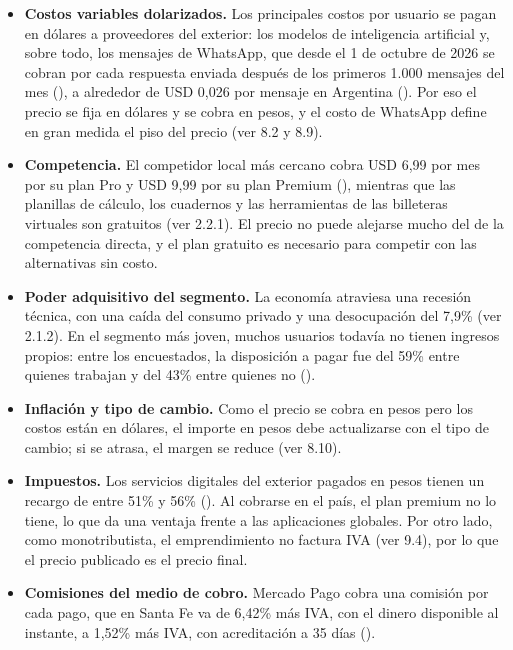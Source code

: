 \begin{itemize}
\tightlist
\item
  \textbf{Costos variables dolarizados.} Los principales costos por
  usuario se pagan en dólares a proveedores del exterior: los modelos de
  inteligencia artificial y, sobre todo, los mensajes de WhatsApp, que
  desde el 1 de octubre de 2026 se cobran por cada respuesta enviada
  después de los primeros 1.000 mensajes del mes
  (), a alrededor de USD
  0,026 por mensaje en Argentina
  (). Por eso el precio
  se fija en dólares y se cobra en pesos, y el costo de WhatsApp define
  en gran medida el piso del precio (ver 8.2 y 8.9).
\item
  \textbf{Competencia.} El competidor local más cercano cobra USD 6,99
  por mes por su plan Pro y USD 9,99 por su plan Premium
  (), mientras que las planillas
  de cálculo, los cuadernos y las herramientas de las billeteras
  virtuales son gratuitos (ver 2.2.1). El precio no puede alejarse mucho
  del de la competencia directa, y el plan gratuito es necesario para
  competir con las alternativas sin costo.
\item
  \textbf{Poder adquisitivo del segmento.} La economía atraviesa una
  recesión técnica, con una caída del consumo privado y una desocupación
  del 7,9\% (ver 2.1.2). En el segmento más joven, muchos usuarios
  todavía no tienen ingresos propios: entre los encuestados, la
  disposición a pagar fue del 59\% entre quienes trabajan y del 43\%
  entre quienes no ().
\item
  \textbf{Inflación y tipo de cambio.} Como el precio se cobra en pesos
  pero los costos están en dólares, el importe en pesos debe
  actualizarse con el tipo de cambio; si se atrasa, el margen se reduce
  (ver 8.10).
\item
  \textbf{Impuestos.} Los servicios digitales del exterior pagados en
  pesos tienen un recargo de entre 51\% y 56\%
  (). Al cobrarse en el
  país, el plan premium no lo tiene, lo que da una ventaja frente a las
  aplicaciones globales. Por otro lado, como monotributista, el
  emprendimiento no factura IVA (ver 9.4), por lo que el precio
  publicado es el precio final.
\item
  \textbf{Comisiones del medio de cobro.} Mercado Pago cobra una
  comisión por cada pago, que en Santa Fe va de 6,42\% más IVA, con el
  dinero disponible al instante, a 1,52\% más IVA, con acreditación a 35
  días ().
\end{itemize}

